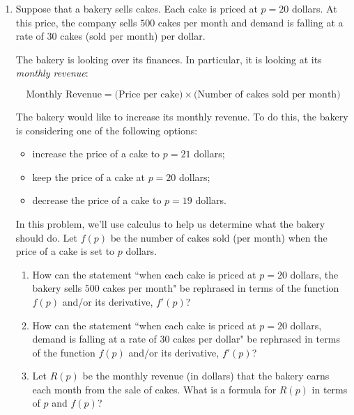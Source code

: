 \documentclass[12pt]{exam}
\begin{document}
\begin{enumerate}
\begin{enumerate}
\vfill

\end{enumerate}

\newpage



\item Suppose that a bakery sells cakes. Each cake is priced at $p=20$ dollars. At this price, the company sells $500$ cakes per month and demand is falling at a rate of $30$ cakes (sold per month) per dollar. 

The bakery is looking over its finances. In particular, it is looking at its \emph{monthly revenue}:

$$\text{Monthly Revenue}=\Big(\text{Price per cake}\Big)\times\Big(\text{Number of cakes sold per month}\Big)$$

The bakery would like to increase its monthly revenue. To do this, the bakery is considering one of the following options:

\begin{itemize}
	\item increase the price of a cake to $p=21$ dollars;
	\item keep the price of a cake at $p=20$ dollars;
	\item decrease the price of a cake to $p=19$ dollars.
\end{itemize}

In this problem, we'll use calculus to help us determine what the bakery should do. Let $f(p)$ be the number of cakes sold (per month) when the price of a cake is set to $p$ dollars. 

\begin{enumerate}

	\item How can the statement ``when each cake is priced at $p=20$ dollars, the bakery sells $500$ cakes per month" be rephrased in terms of the function $f(p)$ and/or its derivative, $f'(p)$? 
	
	\vfill
	
	\item How can the statement ``when each cake is priced at $p=20$ dollars, demand is falling at a rate of $30$ cakes per dollar" be rephrased in terms of the function $f(p)$ and/or its derivative, $f'(p)$?
	
	\vfill
	
	\item Let $R(p)$ be the monthly revenue (in dollars) that the bakery earns each month from the sale of cakes. What is a formula for $R(p)$ in terms of $p$ and $f(p)$?
	

\end{enumerate}
\end{enumerate}
\end{document}
